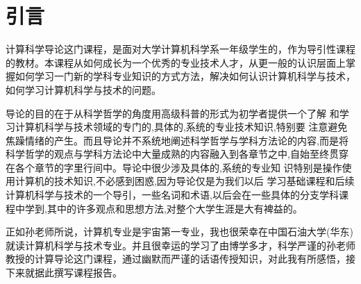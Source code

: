 \documentclass{article}
\begin{document}
\thispagestyle{empty}
\newpage
\setcounter{page}{1}
\section{引言}
计算科学导论这门课程，是面对大学计算机科学系一年级学生的，作为导引性课程的教材。本课程从如何成长为一个优秀的专业技术人才，从更一般的认识层面上掌握如何学习一门新的学科专业知识的方式方法，解决如何认识计算机科学与技术，如何学习计算机科学与技术的问题。\par
导论的目的在于从科学哲学的角度用高级科普的形式为初学者提供一个了解 和学习计算机科学与技术领域的专门的,具体的,系统的专业技术知识,特别要 注意避免焦躁情绪的产生。而且导论并不系统地阐述科学哲学与学科方法论的内容,而是将科学哲学的观点与学科方法论中大量成熟的内容融入到各章节之中,自始至终贯穿在各个章节的字里行间中。导论中很少涉及具体的,系统的专业知 识特别是操作使用计算机的技术知识,不必感到困惑,因为导论仅是为我们以后 学习基础课程和后续计算机科学与技术的一个导引，一些名词和术语,以后会在一些具体的分支学科课程中学到,其中的许多观点和思想方法,对整个大学生涯是大有裨益的。\par
正如孙老师所说，计算机专业是宇宙第一专业，我也很荣幸在中国石油大学(华东)就读计算机科学与技术专业。并且很幸运的学习了由博学多才，科学严谨的孙老师教授的计算导论这门课程，通过幽默而严谨的话语传授知识，对此我有所感悟，接下来就据此撰写课程报告。\par
\end{document}
